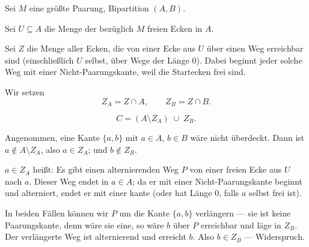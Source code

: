 \begin{merksatz}
Sei $M$ eine größte Paarung, Bipartition $(A,B)$.

Sei $U \subseteq A$ die Menge der bezüglich $M$ freien Ecken in $A$.

Sei $Z$ die Menge aller Ecken, die von einer Ecke aus $U$ über einen  Weg erreichbar sind (einschließlich $U$ selbst, über Wege der Länge $0$). Dabei beginnt jeder solche Weg mit einer Nicht-Paarungskante, weil die Startecken frei sind.

Wir setzen
\[ Z_A = Z \cap A, \qquad Z_B = Z \cap B . \]

\[ C = (A \setminus Z_A) \;\cup\; Z_B . \]

\begin{center}
\end{center}

Angenommen, eine Kante $\{a,b\}$ mit $a \in A$, $b \in B$ wäre nicht überdeckt. Dann ist $a \notin A \setminus Z_A$, also $a \in Z_A$; und $b \notin Z_B$.

$a \in Z_A$ heißt: Es gibt einen alternierenden Weg $P$ von einer freien Ecke aus $U$ nach $a$. Dieser Weg endet in $a \in A$; da er mit einer Nicht-Paarungskante beginnt und alterniert, endet er mit einer kante (oder hat Länge $0$, falls $a$ selbst frei ist).

In beiden Fällen können wir $P$ um die Kante $\{a,b\}$ verlängern --- sie ist keine Paarungskante, denn wäre sie eine, so wäre $b$ über $P$ erreichbar und läge in $Z_B$. Der verlängerte Weg ist alternierend und erreicht $b$. Also $b \in Z_B$ --- Widerspruch. \checkmark


\end{merksatz}
